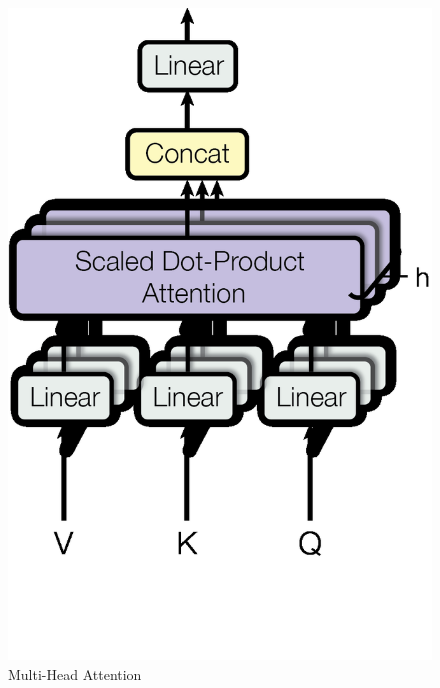 \begin{minipage}[]{\textwidth}
\begin{minipage}[ht]{.35\textwidth}
\begin{figure}[H]
        \includegraphics[width=.9\textwidth]{literature/imgs/ext-attention-multihead.png}
        \vspace*{-2em}
        \caption{Multi-Head Attention \cite{vaswani2017attention}}
        \label{fig:ext-attention-multihead}
    \end{figure}
\end{minipage}
\hspace{1em}
\begin{minipage}[ht]{.52\textwidth}
    \begin{figure}[H]
        \centering

\end{figure}
\end{minipage}
\end{minipage}
